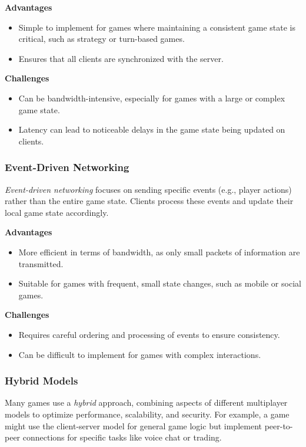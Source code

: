 \documentclass{article} %
\begin{document}
\textbf{Advantages}
\begin{itemize}
	\item Simple to implement for games where maintaining a consistent game state is critical, such as strategy or turn-based games.
	\item Ensures that all clients are synchronized with the server.
\end{itemize}

\textbf{Challenges}
\begin{itemize}
	\item Can be bandwidth-intensive, especially for games with a large or complex game state.
	\item Latency can lead to noticeable delays in the game state being updated on clients.
\end{itemize}

\subsubsection{Event-Driven Networking}
\textit{Event-driven networking} focuses on sending specific events (e.g., player actions) rather than the entire game state. Clients process these events and update their local game state accordingly.

\textbf{Advantages}
\begin{itemize}
	\item More efficient in terms of bandwidth, as only small packets of information are transmitted.
	\item Suitable for games with frequent, small state changes, such as mobile or social games.
\end{itemize}

\textbf{Challenges}
\begin{itemize}
	\item Requires careful ordering and processing of events to ensure consistency.
	\item Can be difficult to implement for games with complex interactions.
\end{itemize}

\subsubsection{Hybrid Models}
Many games use a \textit{hybrid} approach, combining aspects of different multiplayer models to optimize performance, scalability, and security. For example, a game might use the client-server model for general game logic but implement peer-to-peer connections for specific tasks like voice chat or trading.
\end{document}
